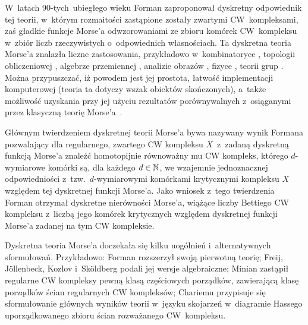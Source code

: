 W~latach 90-tych~ubiegłego wieku Forman \cite{Forman98} zaproponował dyskretny odpowiednik tej teorii, w~którym rozmaitości zastąpione zostały zwartymi CW~kompleksami, zaś gładkie funkcje Morse'a odwzorowaniami ze zbioru komórek CW~kompleksu w~zbiór liczb rzeczywistych o~odpowiednich własnościach. Ta dyskretna teoria Morse'a znalazła liczne zastosowania, przykładowo w~kombinatoryce \cite{Jonsson08}, topologii obliczeniowej \cite{Harker13,Sergeraert}, algebrze przemiennej \cite{Jollenbeck05}, analizie obrazów \cite{Robins11}, fizyce \cite{Engstrom09}, teorii grup \cite{Farley05}. Można przypuszczać, iż powodem jest jej prostota, łatwość implementacji komputerowej (teoria ta dotyczy wszak obiektów skończonych), a~także możliwość uzyskania przy jej użyciu rezultatów porównywalnych z~osiąganymi przez klasyczną teorię Morse'a~\cite{Benedetti13,Gallais10}.

Głównym twierdzeniem dyskretnej teorii Morse'a bywa nazywany wynik Formana \cite[Corollary 3.5]{Forman98} pozwalający dla regularnego, zwartego CW kompleksu $X$~z~zadaną dyskretną funkcją Morse'a znaleźć homotopijnie równoważny mu CW kompleks, którego \mbox{$d$-wymiarowe} komórki są, dla każdego $d\in\mathbb{N}$, we wzajemnie jednoznacznej odpowiedniości z~tzw.~\mbox{$d$-wymiarowymi} komórkami krytycznymi kompleksu $X$ względem tej dyskretnej funkcji Morse'a. Jako wniosek z~tego twierdzenia Forman \cite[Corollaries 3.6, 3.7]{Forman98} otrzymał dyskretne nierówności Morse'a, wiążące liczby Bettiego CW kompleksu z~liczbą jego komórek krytycznych względem dyskretnej funkcji Morse'a zadanej na tym CW kompleksie.

Dyskretna teoria Morse'a doczekała się kilku uogólnień i~alternatywnych sformułowań. Przykładowo: Forman \cite{Forman98a,Forman02a,Forman02b} rozszerzył swoją pierwotną teorię; Freij, J\"ollenbeck, Kozlov i~Sk\"oldberg \cite{Freij07,Jollenbeck05,Kozlov05,Skoldberg06} podali jej wersje algebraiczne; %
Minian \cite{Minian12} zastąpił regularne CW kompleksy pewną klasą częściowych porządków, zawierającą klasę porządków ścian regularnych CW kompleksów; Chariemu \cite{Chari00} przypisuje się sformułowanie głównych wyników teorii w~języku skojarzeń w~diagramie Hassego uporządkowanego zbioru ścian rozważanego CW~kompleksu.


